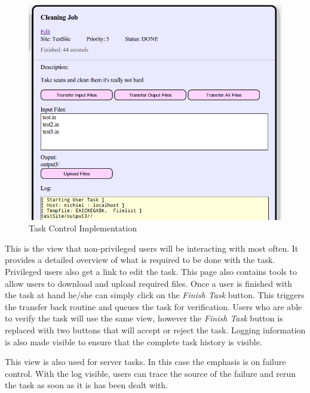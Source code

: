 \documentclass[12pt,a4paper]{report}
\begin{document}
\begin{description}
\begin{figure}[!h]
\begin{center}
            \includegraphics[scale=0.35]{figures/task_control_impl2.png}
        \end{center}
        \caption{Task Control Implementation}
        \label{task_control_impl2}
    \end{figure}
    This is the view that non-privileged users will be interacting with most often. It provides
    a detailed overview of what is required to be done with the task. Privileged users also
    get a link to edit the task. This page also contains tools to allow users to download
    and upload required files. Once a user is finished with the task at hand he/she can
    simply click on the \emph{Finish Task} button. This triggers the transfer back routine
    and queues the task for verification. Users who are able to verify the task will use the
    same view, however the \emph{Finish Task} button is replaced with two buttons that will
    accept or reject the task. Logging information is also made visible to ensure that the
    complete task history is visible.

    This view is also used for server tasks. In this case the emphasis is on failure control.
    With the log visible, users can trace the source of the failure and rerun the task as soon
    as it is has been dealt with.


\end{description}
\end{document}
